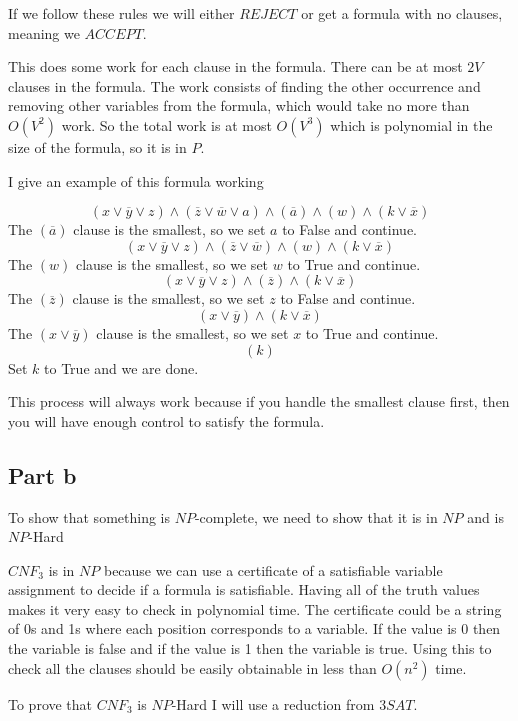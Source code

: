 \documentclass[12pt]{article}
\begin{document}
If we follow these rules we will either $REJECT$ or get a formula with no clauses, meaning we $ACCEPT$.

This does some work for each clause in the formula. There can be at most $2V$ clauses in the formula. The work consists of finding the other occurrence and removing other variables from the formula, which would take no more than $O(V^2)$ work. So the total work is at most $O(V^3)$ which is polynomial in the size of the formula, so it is in $P$.

I give an example of this formula working

$$ (x \lor \overline{y} \lor z) \land (\overline{z} \lor \overline{w}\lor a ) \land (\overline{a}) \land (w) \land (k \lor \overline{x}) $$
The $(\overline{a})$ clause is the smallest, so we set $a$ to False and continue.
$$ (x \lor \overline{y} \lor z) \land (\overline{z} \lor \overline{w}) \land (w) \land (k \lor \overline{x}) $$
The $(w)$ clause is the smallest, so we set $w$ to True and continue.
$$ (x \lor \overline{y} \lor z) \land (\overline{z})  \land (k \lor \overline{x}) $$
The $(\overline{z})$ clause is the smallest, so we set $z$ to False and continue.
$$ (x \lor \overline{y}) \land (k \lor \overline{x}) $$
The $(x \lor \overline{y})$ clause is the smallest, so we set $x$ to True and continue.
$$ (k) $$
Set $k$ to True and we are done.


This process will always work because if you handle the smallest clause first, then you will have enough control to satisfy the formula.



\subsection*{Part b}

To show that something is $NP$-complete, we need to show that it is in $NP$ and is $NP$-Hard

$CNF_3$ is in $NP$ because we can use a certificate of a satisfiable variable assignment to decide if a formula is satisfiable. Having all of the truth values makes it very easy to check in polynomial time. The certificate could be a string of 0s and 1s where each position corresponds to a variable. If the value is 0 then the variable is false and if the value is 1 then the variable is true. Using this to check all the clauses should be easily obtainable in less than $O(n^2)$ time.

To prove that $CNF_3$ is $NP$-Hard I will use a reduction from $3SAT$.
\end{document}
